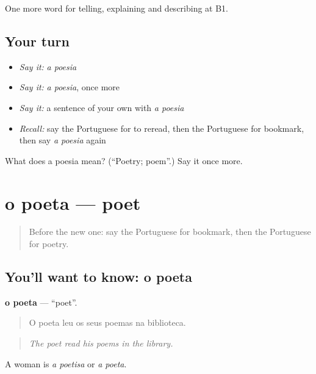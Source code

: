 \begin{grammarlens}[title={What you've built}]
One more word for telling, explaining and describing at B1.
\end{grammarlens}

\subsection*{Your turn}
\begin{itemize}
\raggedright
  \item \emph{Say it:} \emph{a poesia}
  \item \emph{Say it:} \emph{a poesia}, once more
  \item \emph{Say it:} a sentence of your own with \emph{a poesia}
  \item \emph{Recall:} say the Portuguese for to reread, then the Portuguese for bookmark, then say \emph{a poesia} again
\end{itemize}

\begin{tcolorbox}[breakable,colback=teal!4,colframe=teal!35!black,title={Before you move on}]
What does a poesia mean? (\textquotedblleft{}Poetry; poem\textquotedblright{}.) Say it once more.
\end{tcolorbox}
\section[o poeta]{o poeta — poet}

\label{lesson:PT-C524-poeta}



\begin{quote}
Before the new one: say the Portuguese for bookmark, then the Portuguese for poetry.
\end{quote}

\subsection*{You'll want to know: o poeta}
\textbf{o poeta} — \textquotedblleft{}poet\textquotedblright{}.

\begin{quote}
O poeta leu os seus poemas na biblioteca.
\end{quote}

\begin{quote}
\emph{The poet read his poems in the library.}
\end{quote}

A woman is \emph{a poetisa} or \emph{a poeta}.

